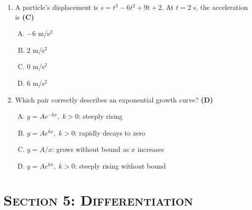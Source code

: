 \documentclass[10pt,a4paper]{article}
\newcommand{\topic}[1]{\section*{\large\textsc{#1}}}
\begin{document}
\begin{enumerate}[1.]
\item A particle's displacement is $s = t^3 - 6t^2 + 9t + 2$. At $t = 2$ s, the acceleration is \hfill \textbf{(C)}
\begin{enumerate}[(A)]
    \item $-6$ m/s$^2$
    \item $2$ m/s$^2$
    \item $0$ m/s$^2$
    \item $6$ m/s$^2$
\end{enumerate}

\item Which pair correctly describes an exponential growth curve? \hfill \textbf{(D)}
\begin{enumerate}[(A)]
    \item $y = A e^{-kx},\; k>0$: steeply rising
    \item $y = Ae^{kx},\; k>0$: rapidly decays to zero
    \item $y = A/x$: grows without bound as $x$ increases
    \item $y = Ae^{kx},\; k>0$: steeply rising without bound
\end{enumerate}

\end{enumerate}

\newpage
\topic{Section 5: Differentiation}
\end{document}
